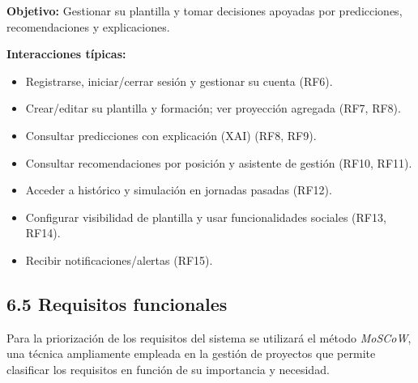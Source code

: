 \textbf{Objetivo:} Gestionar su plantilla y tomar decisiones apoyadas por predicciones, recomendaciones 
y explicaciones.

\textbf{Interacciones típicas:}
\begin{itemize}
  \item Registrarse, iniciar/cerrar sesión y gestionar su cuenta (RF6).
  \item Crear/editar su plantilla y formación; ver proyección agregada (RF7, RF8).
  \item Consultar predicciones con explicación (XAI) (RF8, RF9).
  \item Consultar recomendaciones por posición y asistente de gestión (RF10, RF11).
  \item Acceder a histórico y simulación en jornadas pasadas (RF12).
  \item Configurar visibilidad de plantilla y usar funcionalidades sociales (RF13, RF14).
  \item Recibir notificaciones/alertas (RF15).
\end{itemize}

\subsection{6.5 Requisitos funcionales}

Para la priorización de los requisitos del sistema se utilizará el método \textit{MoSCoW}, una técnica ampliamente 
empleada en la gestión de proyectos que permite clasificar los requisitos en función de su importancia y 
necesidad. 

\newcommand{\RFTable}[5]{%
\begin{table}[H]
  \centering
  \renewcommand{\arraystretch}{1.18}
  \begin{tabular}{@{}|>{\centering\arraybackslash}p{0.09\linewidth}|>{\raggedright\arraybackslash}p{0.43\linewidth}|>{\raggedright\arraybackslash}p{0.43\linewidth}|@{}}
    \hline
    \textbf{ID} & \textbf{Descripción} & \textbf{Historia de usuario} \\
    \hline
    \multirow{3}{*}{\textbf{#1}} & \rule{0pt}{4.2ex}#2 & \begingroup\let\\\newline #3\endgroup \\
    \cline{2-3}
    & \textbf{Información del Requisito} & \textbf{Criterios de aceptación} \\
    \cline{2-3}
    & \rule{0pt}{4.2ex}\begingroup\let\\\newline #4\endgroup & \begingroup\let\\\newline #5\endgroup \\
    \hline
  \end{tabular}
  \renewcommand{\arraystretch}{1}
\end{table}
}

